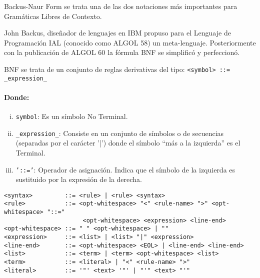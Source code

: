 Backus-Naur Form se trata una de las dos notaciones más importantes para Gramáticas Libres de Contexto.

John Backus, diseñador de lenguajes en IBM propuso para el Lenguaje de Programación IAL (conocido como ALGOL 58) un meta-lenguaje. Posteriormente con la publicación de ALGOL 60 la fórmula BNF se simplificó y perfeccionó. 

BNF se trata de un conjunto de reglas derivativas del tipo: \texttt{<symbol> ::= \_expression\_}

\paragraph*{Donde:} 

\begin{enumerate}[i.]

\item \texttt{symbol}: Es un símbolo No Terminal. 

\item \texttt{\_expression\_}: Consiste en un conjunto de símbolos o de secuencias (separadas por el carácter '|') donde el símbolo ``más a la izquierda'' es el Terminal.

\item \texttt{'::='}: Operador de asignación. Indica que el símbolo de la izquierda es sustituido por la expresión de la derecha.

\end{enumerate}


\begin{verbatim}
<syntax>         ::= <rule> | <rule> <syntax>
<rule>           ::= <opt-whitespace> "<" <rule-name> ">" <opt-whitespace> "::=" 
					  <opt-whitespace> <expression> <line-end>
<opt-whitespace> ::= " " <opt-whitespace> | ""
<expression>     ::= <list> | <list> "|" <expression>
<line-end>       ::= <opt-whitespace> <EOL> | <line-end> <line-end>
<list>           ::= <term> | <term> <opt-whitespace> <list>
<term>           ::= <literal> | "<" <rule-name> ">"
<literal>        ::= '"' <text> '"' | "'" <text> "'" 
\end{verbatim}

